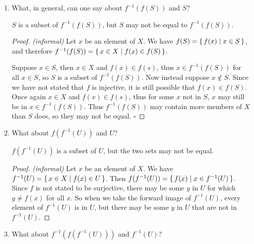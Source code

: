 \documentclass[../../main.tex]{subfiles}
\begin{document}
\begin{enumerate}
    \item
        \begin{q}
            What, in general, can one say about $f^{-1}(f(S))$ and $S$?
        \end{q}
        
        \begin{ans}
            $S$ is a subset of $f^{-1}(f(S))$, but $S$ may not be equal to $f^{-1}(f(S))$.
        \end{ans}
        \begin{proof}
            \emph{(informal)} 
            Let $x$ be an element of $X$. 
            We have $f(S) = \{\,f(x)\mid x \in S\,\}$, and therefore $f^{-1}(f(S)) = \{\,x \in X\mid f(x) \in f(S)\,\}$.

            Suppose $x \in S$, then $x \in X$ and $f(x) \in f(s)$, thus $x \in f^{-1}(f(S))$ for all $x \in S$, so $S$ is a subset of $f^{-1}(f(S))$. Now instead suppose $x \notin S$. Since we have not stated that $f$ is injective, it is still possible that $f(x) \in f(S)$. Once again $x \in X$ and $f(x) \in f(s)$, thus for some $x$ not in $S$, $x$ may still be in $x \in f^{-1}(f(S))$.
            Thus $f^{-1}(f(S))$ may contain more members of $X$ than $S$ does, so they may not be equal.
            $\square$
        \end{proof}
    \item
        \begin{q}
            What about $f(f^{-1}(U))$ and $U$?
        \end{q}
        
        \begin{ans}
            $f(f^{-1}(U))$ is a subset of $U$, but the two sets may not be equal.
        \end{ans}
            
        \begin{proof}
                \emph{(informal)}
                Let $x$ be an element of $X$. 
                We have $f^{-1}(U)=\{\,x \in X\mid f(x) \in U\,\}$. 
                Then $f(f^{-1}(U))=\{\,f(x)\mid x \in f^{-1}(U)\,\}$.
                Since $f$ is not stated to be surjective, there may be some $y$ in $U$ for which $y \neq f(x)$ for all $x$.
                So when we take the forward image of $f^{-1}(U)$, every element of $f^{-1}(U)$ is in $U$, but there may be some $y$ in $U$ that are not in $f^{-1}(U)$.
        \end{proof}
    \item 
        \begin{q}
            What about $f^{-1}(f(f^{-1}(U)))$ and $f^{-1}(U)$? 
        \end{q}
        

\end{enumerate}
\end{document}
